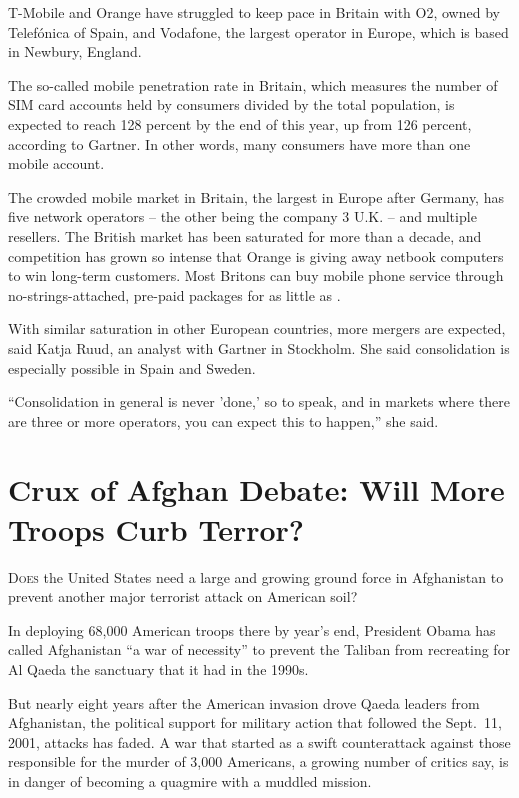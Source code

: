 ﻿\documentclass[12pt]{article}
\begin{document}
T-Mobile and Orange have struggled to keep pace in Britain with O2, owned by Telef\'onica of Spain,
and Vodafone, the largest operator in Europe, which is based in Newbury, England.

The so-called mobile penetration rate in Britain, which measures the number of SIM card accounts
held by consumers divided by the total population, is expected to reach 128 percent by the end of
this year, up from 126 percent, according to Gartner. In other words, many consumers have more than
one mobile account.

The crowded mobile market in Britain, the largest in Europe after Germany, has five network
operators -- the other being the company 3 U.K. -- and multiple resellers. The British market has
been saturated for more than a decade, and competition has grown so intense that Orange is giving
away netbook computers to win long-term customers. Most Britons can buy mobile phone service through
no-strings-attached, pre-paid packages for as little as .

With similar saturation in other European countries, more mergers are expected, said Katja Ruud, an
analyst with Gartner in Stockholm. She said consolidation is especially possible in Spain and
Sweden.

``Consolidation in general is never 'done,' so to speak, and in markets where there are three or
more operators, you can expect this to happen,'' she said.

\section{Crux of Afghan Debate: Will More Troops Curb Terror?}

\lettrine{D}{oes} the United States need a large and growing ground force in Afghanistan to prevent
another major terrorist attack on American soil?

In deploying 68,000 American troops there by year's end, President Obama has called Afghanistan ``a
war of necessity'' to prevent the Taliban from recreating for Al Qaeda the sanctuary that it had in
the 1990s.

But nearly eight years after the American invasion drove Qaeda leaders from Afghanistan, the
political support for military action that followed the Sept.~11, 2001, attacks has faded. A war
that started as a swift counterattack against those responsible for the murder of 3,000 Americans, a
growing number of critics say, is in danger of becoming a quagmire with a muddled mission.
\end{document}
